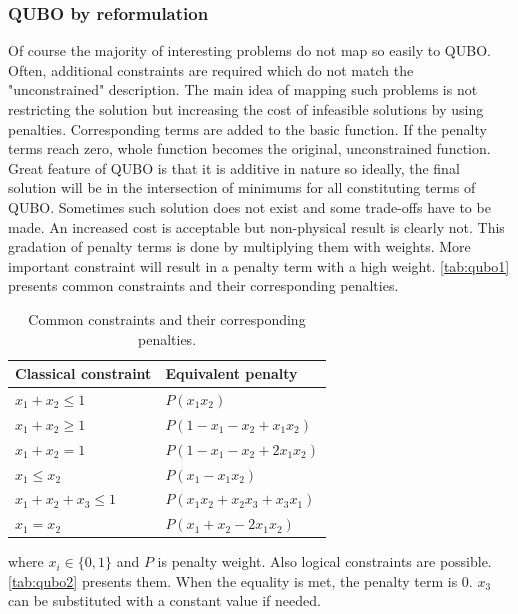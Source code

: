 \subsubsection{QUBO by reformulation}
Of course the majority of interesting problems do not map so easily to QUBO. Often, additional constraints are required which do not match the "unconstrained" description. The main idea of mapping such problems is not restricting the solution but increasing the cost of infeasible solutions by using penalties. Corresponding terms are added to the basic function. If the penalty terms reach zero, whole function becomes the original, unconstrained function. Great feature of QUBO is that it is additive in nature so ideally, the final solution will be in the intersection of minimums for all constituting terms of QUBO. Sometimes such solution does not exist and some trade-offs have to be made. An increased cost is acceptable but non-physical result is clearly not. This gradation of penalty terms is done by multiplying them with weights. More important constraint will result in a penalty term with a high weight. \autoref{tab:qubo1} presents common constraints and their corresponding penalties.

\begin{table}[h]
\begin{center}
\begin{tabular}{ l l }
 Classical constraint & Equivalent penalty\\ 
  \hline
 $x_1 + x_2 \le 1$ & $P(x_1x_2)$ \\  
 $x_1 + x_2 \ge 1$ & $P(1- x_1 - x_2 + x_1x_2)$ \\
 $x_1 + x_2 = 1$ & $P(1- x_1 - x_2 + 2x_1x_2)$ \\
 $x_1 \le x_2$ & $P(x_1 - x_1x_2)$ \\
 $x_1 + x_2 + x_3 \le 1$ & $P(x_1x_2 + x_2x_3 + x_3x_1)$ \\
 $x_1 = x_2$ & $P(x_1 + x_2 - 2x_1x_2)$ \\
\end{tabular}
\end{center}
\caption{Common constraints and their corresponding penalties.}
\label{tab:qubo1}
\end{table}

where $x_i\in\lbrace 0,1\rbrace$ and $P$ is penalty weight. Also logical constraints are possible. \autoref{tab:qubo2} presents them. When the equality is met, the penalty term is $0$. $x_3$ can be substituted with a constant value if needed.


